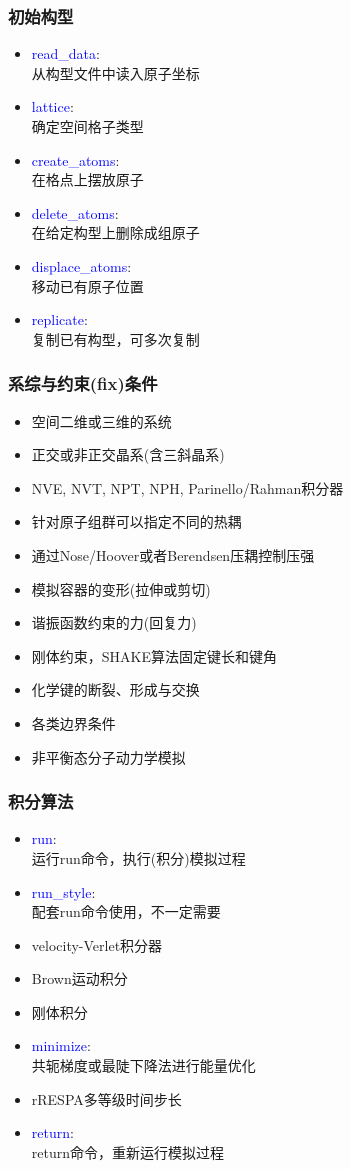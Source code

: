 \frame
{
	\frametitle{初始构型}
	\begin{itemize}
		\item \textcolor{blue}{read\_data}:\\
			从构型文件中读入原子坐标
		\item \textcolor{blue}{lattice}:\\
			确定空间格子类型
		\item \textcolor{blue}{create\_atoms}:\\
			在格点上摆放原子
		\item \textcolor{blue}{delete\_atoms}:\\
			在给定构型上删除成组原子
		\item \textcolor{blue}{displace\_atoms}:\\
			移动已有原子位置
		\item \textcolor{blue}{replicate}:\\
			复制已有构型，可多次复制
	\end{itemize}
}

\frame
{
	\frametitle{系综与约束\textrm{(fix)}条件}
	\begin{itemize}
		\item 空间二维或三维的系统
		\item 正交或非正交晶系(含三斜晶系)
		\item \textrm{NVE, NVT, NPT, NPH, Parinello/Rahman}积分器
		\item 针对原子组群可以指定不同的热耦
		\item 通过\textrm{Nose/Hoover}或者\textrm{Berendsen}压耦控制压强
		\item 模拟容器的变形(拉伸或剪切)
		\item 谐振函数约束的力(回复力)
		\item 刚体约束，\textrm{SHAKE}算法固定键长和键角
		\item 化学键的断裂、形成与交换
		\item 各类边界条件
		\item 非平衡态分子动力学模拟
	\end{itemize}
}

\frame
{
	\frametitle{积分算法}
	\begin{itemize}
		\item \textcolor{blue}{run}:\\
			运行\textrm{run}命令，执行(积分)模拟过程
		\item \textcolor{blue}{run\_style}:\\
			配套\textrm{run}命令使用，不一定需要
		\item \textrm{velocity-Verlet}积分器
		\item \textrm{Brown}运动积分
		\item 刚体积分
		\item \textcolor{blue}{minimize}:\\
			共轭梯度或最陡下降法进行能量优化
		\item \textrm{rRESPA}多等级时间步长
		\item \textcolor{blue}{return}:\\
			\textrm{return}命令，重新运行模拟过程
	\end{itemize}
}

